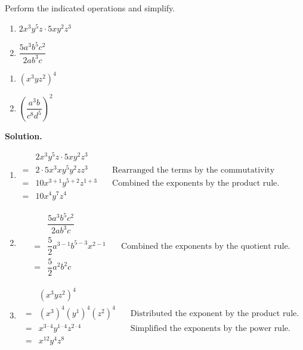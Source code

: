 \begin{ex} \label{exponentreview2}  Perform the indicated operations and simplify.

\begin{multicols}{2}
\begin{enumerate}

\item $2 x^3 y^5 z \cdot 5 x y^2 z^3$
\item $ \dfrac{5 a^3 b^5 c^2}{2 a b^3 c}$

\setcounter{HW}{\value{enumi}}
\end{enumerate}
\end{multicols}

\begin{multicols}{2}
\begin{enumerate}

\setcounter{enumi}{\value{HW}}

\item $(x^3 y z^2)^4$
\item $\left( \dfrac{a^3 b}{c^8 d^5} \right)^2$

\end{enumerate}
\end{multicols}

{\bf Solution.}

\begin{enumerate}

\item \[
\begin{array}{cll}
& 2 x^3 y^5 z \cdot 5 x y^2 z^3 & \\
= & 2\cdot5 x^3 x y^5 y^2 z z^3 & \quad\text{Rearranged the terms by the commutativity property.}\\[8pt]
= & 10 x^{3+1} y^{5+2} z^{1+3} & \quad\text{Combined the exponents by the product rule.}\\[8pt]
= & 10 x^4 y^7 z^4 
\end{array}
\]

\item \[
\begin{array}{cll}
& \dfrac{5 a^3 b^5 c^2}{2 a b^3 c} & \\[8pt]
= & \dfrac{5}{2}a^{3-1} b^{5-3} x^{2-1}& \quad\text{Combined the exponents by the quotient rule.}\\[8pt]
= & \dfrac{5}{2} a^2 b^2 c   
\end{array}
\]

\item \[
\begin{array}{cll}
& (x^3 y z^2)^4 & \\[8pt]
= & (x^3)^4 (y^1)^4 (z^2)^4 & \quad\text{Distributed the exponent by the product rule.}\\[8pt]
= & x^{3\cdot 4} y^{1\cdot 4} z^{2\cdot 4} & \quad\text{Simplified the exponents by the power rule.}\\[8pt]
= & x^{12} y^4 z^8 
\end{array}
\]


\end{enumerate}
\end{ex}
